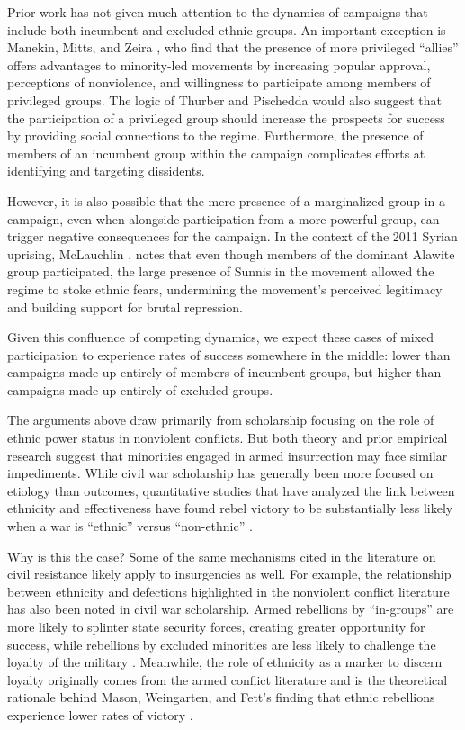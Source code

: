\documentclass[
  letterpaper,
  DIV=11,
  numbers=noendperiod]{scrartcl}
\begin{document}
Prior work has not given much attention to the dynamics of campaigns
that include both incumbent and excluded ethnic groups. An important
exception is Manekin, Mitts, and Zeira \autocite*{Manekin2024}, who find
that the presence of more privileged ``allies'' offers advantages to
minority-led movements by increasing popular approval, perceptions of
nonviolence, and willingness to participate among members of privileged
groups. The logic of Thurber \autocite*{Thurber2018} and Pischedda
\autocite*{Pischedda2020} would also suggest that the participation of a
privileged group should increase the prospects for success by providing
social connections to the regime. Furthermore, the presence of members
of an incumbent group within the campaign complicates efforts at
identifying and targeting dissidents.

However, it is also possible that the mere presence of a marginalized
group in a campaign, even when alongside participation from a more
powerful group, can trigger negative consequences for the campaign. In
the context of the 2011 Syrian uprising, McLauchlin
\autocite*{McLauchlin2017}, notes that even though members of the
dominant Alawite group participated, the large presence of Sunnis in the
movement allowed the regime to stoke ethnic fears, undermining the
movement's perceived legitimacy and building support for brutal
repression.

Given this confluence of competing dynamics, we expect these cases of
mixed participation to experience rates of success somewhere in the
middle: lower than campaigns made up entirely of members of incumbent
groups, but higher than campaigns made up entirely of excluded groups.

The arguments above draw primarily from scholarship focusing on the role
of ethnic power status in nonviolent conflicts. But both theory and
prior empirical research suggest that minorities engaged in armed
insurrection may face similar impediments. While civil war scholarship
has generally been more focused on etiology than outcomes, quantitative
studies that have analyzed the link between ethnicity and effectiveness
have found rebel victory to be substantially less likely when a war is
``ethnic'' versus ``non-ethnic'' \autocite{Mason1996,deRouen2004}.

Why is this the case? Some of the same mechanisms cited in the
literature on civil resistance likely apply to insurgencies as well. For
example, the relationship between ethnicity and defections highlighted
in the nonviolent conflict literature has also been noted in civil war
scholarship. Armed rebellions by ``in-groups'' are more likely to
splinter state security forces, creating greater opportunity for
success, while rebellions by excluded minorities are less likely to
challenge the loyalty of the military \autocite{McLauchlin2010}.
Meanwhile, the role of ethnicity as a marker to discern loyalty
originally comes from the armed conflict literature and is the
theoretical rationale behind Mason, Weingarten, and Fett's finding that
ethnic rebellions experience lower rates of victory
\autocite*[263]{Mason1996}.
\end{document}
